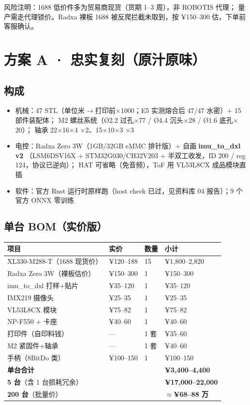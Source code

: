 \documentclass[11pt,a4paper]{ctexart}
\newcommand{\warn}[1]{\textcolor{orange!85!black}{#1}}
\begin{document}
\noindent\warn{风险注明}：1688 低价件多为贸易商现货（货期 1--3 周），非 ROBOTIS 代理；
量产需走代理锁价。Radxa 裸板 1688 被反爬拦截未取到，按 ¥150--300 估，下单前客服确认。

\section{方案 A · 忠实复刻（原汁原味）}

\subsection{构成}
\begin{itemize}[nosep,leftmargin=1.5em]
\item 机械：47 STL（单位米$\to$打印前$\times$1000；E5 实测熔合后 47/47 水密）+ 15 部件装配体；
M2 螺丝系统（Ø2.2 过孔$\times$77 / Ø4.4 沉头$\times$28 / Ø1.6 底孔$\times$20）；
轴承 22$\times$16$\times$4 $\times$2、15$\times$10$\times$3 $\times$3
\item 电控：Radxa Zero 3W（1GB/32GB eMMC 排针版）+ 自画 \textbf{imu\_to\_dxl v2}
（LSM6DSV16X + STM32G030/CH32V203 + 半双工收发，ID 200 / reg 124，协议已逆向）；
HAT 可省略（免音频），ToF 用 VL53L8CX 成品模块直插
\item 软件：官方 Rust 运行时原样跑（host check 已过，见资料库 04 报告）；9 个官方 ONNX 零训练
\end{itemize}

\subsection{单台 BOM（实价版）}
\begin{longtable}{L{5.6cm}L{2.4cm}L{2.2cm}L{4.4cm}}
\toprule
\textbf{项目} & \textbf{实价} & \textbf{数量} & \textbf{小计} \\
\midrule
XL330-M288-T（1688 现货价） & ¥120--188 & 15 & ¥1,800--2,820 \\
Radxa Zero 3W（裸板估价） & ¥150--300 & 1 & ¥150--300 \\
imu\_to\_dxl 打样+贴片 & ¥35--120 & 1 & ¥35--120 \\
IMX219 摄像头 & ¥25--35 & 1 & ¥25--35 \\
VL53L8CX 模块 & ¥75--82 & 1 & ¥75--82 \\
NP-F550 + 卡座 & ¥40--60 & 1 & ¥40--60 \\
打印件（自印料钱） & --- & 1 套 & ¥35--60 \\
M2 紧固件+轴承 & --- & 1 套 & ¥40--60 \\
手柄（8BitDo 类） & ¥100--150 & 1 & ¥100--150 \\
\midrule
\textbf{单台合计} & & & \textbf{¥3,400--4,400} \\
\textbf{5 台}（含 1 台损耗冗余） & & & \textbf{¥17,000--22,000} \\
\textbf{200 台}（批量价） & & & \textbf{$\approx$¥68--88 万} \\
\bottomrule
\end{longtable}
\end{document}
